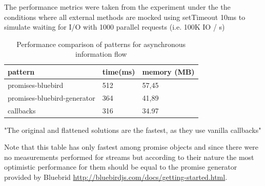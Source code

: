  The performance metrics were taken from the experiment under the the conditions where all external methods are mocked using setTimeout 10ms to simulate waiting for I/O with 1000 parallel requests (i.e. 100K IO / s) \cite{asyncPerformance_2}

\begin{table}[h]
	\begin{center}
		\begin{tabular}{| l | l | l | }
			\hline
			\textbf{pattern} & \textbf{time(ms)} & \textbf{memory (MB)} \\
			\hline
			promises-bluebird & 512 & 57,45 \\
			\hline
			promises-bluebird-generator & 364 & 41,89 \\
			\hline
			callbacks & 316 & 34.97 \\
			\hline
		\end{tabular}
	\end{center}
	\caption{Performance comparison of patterns for asynchronous information flow \cite{asyncPerformance_2}\cite{asyncPerformance}}
\end{table}


"The original and flattened solutions are the fastest, as they use vanilla callbacks"\cite{asyncPerformance}

Note that this table has only fastest among promise objects and since there were no measurements performed for streams but according to their nature the most optimistic performance for them should be equal to the promise generator provided by Bluebrid \url{http://bluebirdjs.com/docs/getting-started.html}.



